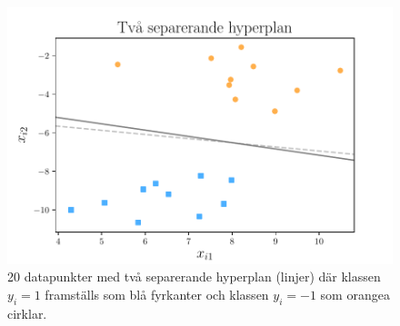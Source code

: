 \documentclass[a4paper, 12pt]{report}
\theoremstyle{definition}
\theoremstyle{remark}
\begin{document}
\begin{figure}[h]
\centering
\includegraphics[width=\linewidth, trim={0.35cm 1.5mm 0.4cm 4.5mm}, clip]{KandFigur1.pdf}
\caption{\label{fig:separatinghyperplane}20 datapunkter med två separerande hyperplan (linjer) där klassen $y_i=1$ framställs som blå fyrkanter och klassen $y_i=-1$ som orangea cirklar.}
\end{figure}
\end{document}
